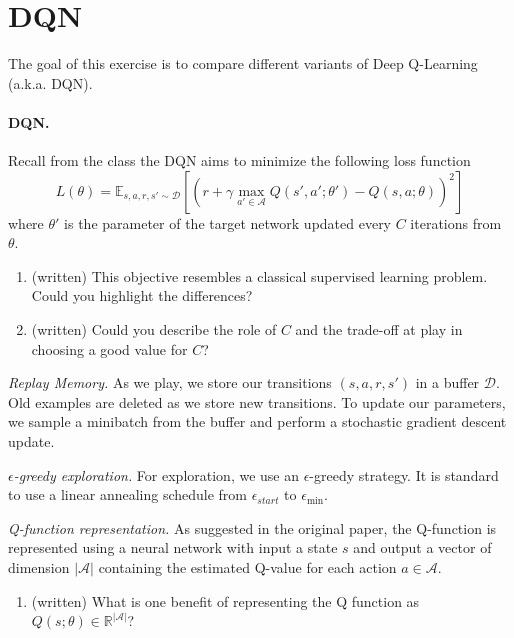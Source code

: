 \documentclass[a4paper]{article}
\begin{document}
\section{DQN}
The goal of this exercise is to compare different variants of Deep Q-Learning (a.k.a. DQN).

\paragraph{DQN.} Recall from the class the DQN aims to minimize the following loss function
\[
    L(\theta) = \mathbb{E}_{s,a,r,s' \sim \mathcal{D}} \left[
        \left(
        r + \gamma \max_{a' \in\mathcal{A}} Q(s',a';\theta') - Q(s,a; \theta)
        \right)^2
        \right ]
\]
where $\theta'$ is the parameter of the target network updated every $C$ iterations from $\theta$.
\begin{enumerate}
    \item (written) This objective resembles a classical supervised learning problem. Could you highlight the differences?
    \item (written) Could you describe the role of $C$ and the trade-off at play in choosing a good value for $C$?
\end{enumerate}


\vspace{.2in}
\emph{Replay Memory.} As we play, we store our transitions $(s, a, r, s')$ in a buffer $\mathcal{D}$. Old examples are deleted as we store new transitions. To update our parameters, we sample a minibatch from the buffer and perform a stochastic gradient descent update.

\vspace{.2in}
\emph{$\epsilon$-greedy exploration.} For exploration, we use an $\epsilon$-greedy strategy. It is standard to use a linear annealing schedule from $\epsilon_{start}$ to $\epsilon_{\min}$.

\vspace{.2in}
\emph{Q-function representation.} As suggested in the original paper, the Q-function is represented using a neural network with input a state $s$ and output a vector of dimension $|\mathcal{A}|$ containing the estimated Q-value for each action $a \in \mathcal{A}$.
\begin{enumerate}
    \item (written) What is one benefit of representing the Q function as $Q(s; \theta) \in \mathbb{R}^{|\mathcal{A}|}$?
\end{enumerate}
\end{document}
